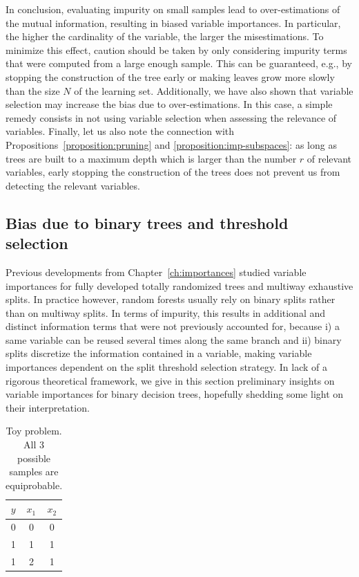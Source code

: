 In conclusion, evaluating impurity on small samples lead to over-estimations of
the mutual information, resulting in biased variable importances. In
particular, the higher the cardinality of the variable,  the larger the
misestimations. To minimize this effect, caution should be taken by only
considering impurity terms that were computed from a large enough sample. This
can be guaranteed, e.g., by stopping the construction of the tree early or
making leaves grow more slowly than the size $N$ of the learning set.
Additionally, we have also shown that variable selection may increase the bias
due to over-estimations. In this case, a simple remedy consists in not using
variable selection when assessing the relevance of variables. Finally, let us
also note the connection with Propositions~\ref{proposition:pruning} and
\ref{proposition:imp-subspaces}: as long as trees are built to a maximum depth
which is larger than the number $r$ of relevant variables, early stopping the
construction of the trees does not prevent us from detecting the relevant variables.

\subsection{Bias due to binary trees and threshold selection}
\label{sec:bias:tree}

Previous developments from Chapter~\ref{ch:importances} studied variable
importances for fully developed totally randomized trees and multiway
exhaustive splits. In practice however, random forests usually rely on binary
splits rather than on multiway splits. In terms of impurity, this results in
additional and distinct information terms that were not previously accounted
for, because i) a same variable can be reused several times along the same
branch and ii) binary splits discretize the information contained in a
variable, making variable importances dependent on the split threshold selection
strategy. In lack of a rigorous theoretical framework, we give in this section
preliminary insights on variable importances for binary decision trees,
hopefully shedding some light on their interpretation.

\begin{table}
    \centering
    \begin{tabular}{| c | c c |}
    \hline
    $y$ & $x_1$ & $x_2$ \\
    \hline
    \hline
    0 & 0 & 0 \\
    1 & 1 & 1 \\
    1 & 2 & 1 \\
    \hline
    \end{tabular}
    \caption{Toy problem. All $3$ possible samples are equiprobable.}
    \label{table:simulation:bias:tree}
\end{table}

